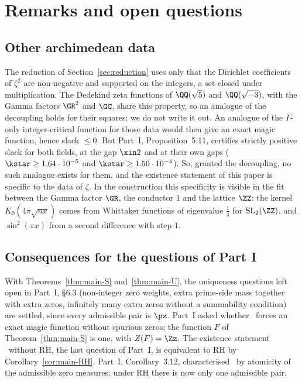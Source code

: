 \section{Remarks and open questions}\label{sec:remarks}

\subsection{Other archimedean data}

The reduction of Section~\ref{sec:reduction} uses only that the Dirichlet coefficients of $\zeta^2$ are non-negative and supported on the
integers, a set closed under multiplication. The Dedekind zeta functions of $\QQ(\sqrt5)$ and $\QQ(\sqrt{-3})$, with the Gamma factors $\GR^2$ and
$\GC$, share this property, so an analogue of the decoupling holds for their squares; we do not write it out. An analogue of the $\Gamma$-only
integer-critical function for those data would then give an exact magic function, hence slack $\le0$. But Part~I, Proposition~5.11, certifies
strictly positive slack for both fields, at the gap $\xin2$ and at their own gaps ($\kstar\ge1.64\cdot10^{-5}$ and $\kstar\ge1.50\cdot10^{-4}$). So,
granted the decoupling, no such analogue exists for them, and the existence statement of this paper is specific to the data of $\zeta$. In the
construction this specificity is visible in the fit between the Gamma factor $\GR$, the conductor $1$ and the lattice $\ZZ$: the kernel
$K_0(4\pi\sqrt{nx})$ comes from Whittaker functions of eigenvalue $\frac14$ for $\mathrm{SL}_2(\ZZ)$, and $\sin^2(\pi x)$ from a second difference
with step $1$.

\subsection{Consequences for the questions of Part I}

With Theorems~\ref{thm:main-S} and~\ref{thm:main-U}, the uniqueness questions left open in Part~I, \S6.3 (non-integer zero weights, extra
prime-side mass together with extra zeros, infinitely many extra zeros without a summability condition) are settled, since every admissible pair
is $\pz$. Part~I asked whether \condU\ forces an exact magic function without spurious zeros; the function $F$ of Theorem~\ref{thm:main-S} is one,
with $Z(F)=\Zz$. The existence statement \condE\ without RH, the last question of Part~I, is equivalent to RH by Corollary~\ref{cor:main-RH}.
Part~I, Corollary~3.12, characterised \condS\ by atomicity of the admissible zero measures; under RH there is now only one admissible pair.

